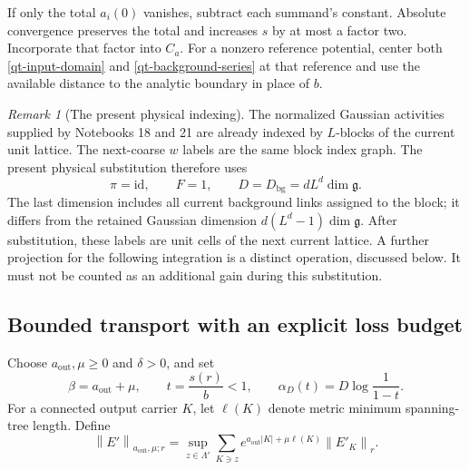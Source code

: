 \documentclass[11pt]{article}
\theoremstyle{remark}
\newtheorem{remark}[theorem]{Remark}
\newcommand{\norm}[1]{\left\|#1\right\|}
\begin{document}
If only the total $a_i(0)$ vanishes, subtract each summand's constant.
Absolute convergence preserves the total and increases $s$ by at most
a factor two. Incorporate that factor into $C_a$. For a nonzero
reference potential, center both \eqref{qt-input-domain} and
\eqref{qt-background-series} at that reference and use the available
distance to the analytic boundary in place of $b$.

\begin{remark}[The present physical indexing]\label{qt-indexing}
The normalized Gaussian activities supplied by Notebooks 18 and 21
are already indexed by $L$-blocks of the current unit lattice. The
next-coarse $w$ labels are the same block index graph. The present
physical substitution therefore uses
\[
 \pi=\mathrm{id},\qquad F=1,\qquad
 D=D_{\mathrm{bg}}=dL^d\dim\mathfrak g.
\]
The last dimension includes all current background links assigned to
the block; it differs from the retained Gaussian dimension
$d(L^d-1)\dim\mathfrak g$. After substitution, these labels are unit
cells of the next current lattice. A further projection for the
following integration is a distinct operation, discussed below.
It must not be counted as an additional gain during this substitution.
\end{remark}

\subsection{Bounded transport with an explicit loss budget}

Choose $a_{\mathrm{out}},\mu\ge0$ and $\delta>0$, and set
\begin{equation}\label{qt-budget-notation}
 \beta=a_{\mathrm{out}}+\mu,\qquad
 t=\frac{s(r)}b<1,\qquad
 \alpha_D(t)=D\log\frac1{1-t}.
\end{equation}
For a connected output carrier $K$, let $\ell(K)$ denote metric
minimum spanning-tree length. Define
\begin{equation}\label{qt-output-norm}
 \norm{E'}_{a_{\mathrm{out}},\mu;r}
 =\sup_{z\in\Lambda'}\sum_{K\ni z}
      e^{a_{\mathrm{out}}|K|+\mu\ell(K)}\norm{E'_K}_r.
\end{equation}
\end{document}
